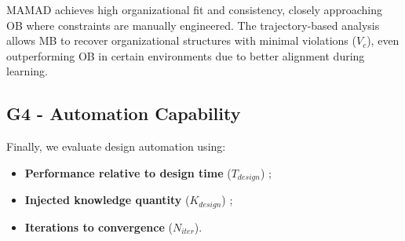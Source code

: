 \documentclass[pdflatex,sn-mathphys-num]{sn-jnl}%
\theoremstyle{thmstyleone}%
\theoremstyle{thmstyletwo}%
\theoremstyle{thmstylethree}%
\begin{document}
MAMAD achieves high organizational fit and consistency, closely approaching OB where constraints are manually engineered. The trajectory-based analysis allows MB to recover organizational structures with minimal violations ($V_c$), even outperforming OB in certain environments due to better alignment during learning.

\subsection{G4 - Automation Capability}

Finally, we evaluate design automation using:

\begin{itemize}
    \item \textbf{Performance relative to design time} ($T_{design}$) ;
    \item \textbf{Injected knowledge quantity} ($K_{design}$) ;
    \item \textbf{Iterations to convergence} ($N_{iter}$).
\end{itemize}
\end{document}
